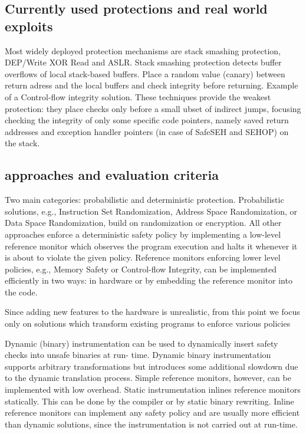 \documentclass{article}
\begin{document}
\subsection{Currently used protections and real world exploits}
Most widely deployed protection mechanisms are stack smashing protection, DEP/Write XOR Read and ASLR. Stack smashing protection detects buffer overflows of local stack-based buffers. Place a random value (canary) between return adress and the local buffers and check integrity before returning. Example of a Control-flow integrity solution. These techniques provide the weakest protection: they place checks only before a small ubset of indirect jumps, focusing checking the integrity of only some specific code pointers, namely saved return addresses and exception handler pointers (in case of SafeSEH and SEHOP) on the stack. 

\subsection{approaches and evaluation criteria}
Two main categories: probabilistic and deterministic protection. Probabilistic solutions, e.g., Instruction
Set Randomization, Address Space Randomization, or Data
Space Randomization, build on randomization or encryption. 
All other approaches enforce a deterministic safety policy by implementing a low-level reference monitor which observes the program execution and halts it whenever it is about to violate the given policy. 
Reference monitors enforcing lower level policies, e.g.,
Memory Safety or Control-flow Integrity, can be implemented efficiently in two ways: in hardware or by embedding the reference monitor into the code. 

Since adding new features to the hardware is unrealistic,
from this point we focus only on solutions which transform
existing programs to enforce various policies

Dynamic
(binary) instrumentation can be used to dynamically insert safety checks into unsafe binaries at run-
time. Dynamic binary instrumentation supports arbitrary
transformations but introduces some additional slowdown
due to the dynamic translation process. Simple reference
monitors, however, can be implemented with low overhead. Static instrumentation inlines reference
monitors statically. This can be done by the compiler or
by static binary rewriting. Inline reference monitors can
implement any safety policy and are usually more efficient
than dynamic solutions, since the instrumentation is not
carried out at run-time.
\end{document}

